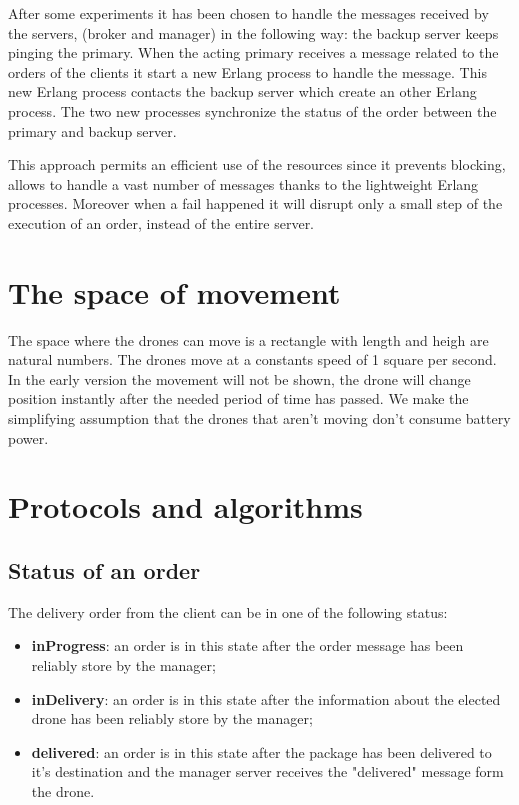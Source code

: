 \documentclass[a4paper, oneside]{memoir}
\begin{document}
After some experiments it has been chosen to handle the messages received by the servers, (broker and manager) in the following way: the backup server keeps pinging the primary. When the acting primary receives a message related to the orders of the clients it start a new Erlang process to handle the message. This new Erlang process contacts the backup server which create an other Erlang process. The two new processes synchronize the status of the order between the primary and backup server.

This approach permits an efficient use of the resources since it prevents blocking, allows to handle a vast number of messages thanks to the lightweight Erlang processes. Moreover when a fail happened it will disrupt only a small step of the execution of an order, instead of the entire server.

\section{The space of movement}
The space where the drones can move is a rectangle with length and heigh are natural numbers. The drones move at a constants speed of 1 square per second.
In the early version the movement will not be shown, the drone will change position instantly after the needed period of time has passed.
We make the simplifying assumption that the drones that aren't moving don't consume battery power.

\section{Protocols and algorithms}


\subsection{Status of an order}
The delivery order from the client can be in one of the following status:
\begin{itemize}
\item \textbf{inProgress}: an order is in this state after the order message has been reliably store by the manager;
\item \textbf{inDelivery}: an order is in this state after the information about the elected drone has been reliably store by the manager;
\item \textbf{delivered}: an order is in this state after the package has been delivered to it's destination and the manager server receives the "delivered" message form the drone.
\end{itemize}
\end{document}
